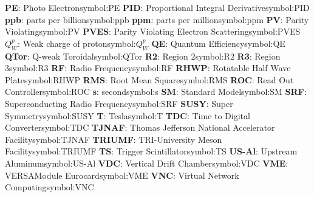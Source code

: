 \begin{tabbing}
\hspace{-0.27cm}
\addsymbol \textbf{PE}: {Photo Electron}{symbol:PE}
\hspace{-0.27cm}
\addsymbol \textbf{PID}: {Proportional Integral Derivative}{symbol:PID}
\hspace{-0.27cm}
\addsymbol \textbf{ppb}: {parts per billion}{symbol:ppb}
\hspace{-0.27cm}
\addsymbol \textbf{ppm}: {parts per million}{symbol:ppm}
\hspace{-0.27cm}
\addsymbol \textbf{PV}: {Parity Violating}{symbol:PV}
\hspace{-0.27cm}
\addsymbol \textbf{PVES}: {Parity Violating Electron Scattering}{symbol:PVES}
\hspace{-0.27cm}
\addsymbol \textbf{$Q_{W}^{p}$}: {Weak charge of proton}{symbol:$Q_{W}^{p}$}
\hspace{-0.27cm}
\addsymbol \textbf{QE}: {Quantum Efficiency}{symbol:QE}
\hspace{-0.27cm}
\addsymbol \textbf{QTor}: {Q-weak Toroidal}{symbol:QTor}
\hspace{-0.27cm}
\addsymbol \textbf{R2}: {Region 2}{symbol:R2}
\hspace{-0.27cm}
\addsymbol \textbf{R3}: {Region 3}{symbol:R3}
\hspace{-0.27cm}
\addsymbol \textbf{RF}: {Radio Frequency}{symbol:RF}
\hspace{-0.27cm}
\addsymbol \textbf{RHWP}: {Rotatable Half Wave Plate}{symbol:RHWP}
\hspace{-0.27cm}
\addsymbol \textbf{RMS}: {Root Mean Square}{symbol:RMS}
\hspace{-0.27cm}
\addsymbol \textbf{ROC}: {Read Out Controller}{symbol:ROC}
\hspace{-0.27cm}
\addsymbol \textbf{s}: {second}{symbol:s}
\hspace{-0.27cm}
\addsymbol \textbf{SM}: {Standard Model}{symbol:SM}
\hspace{-0.27cm}
\addsymbol \textbf{SRF}: {Superconducting Radio Frequency}{symbol:SRF}
\hspace{-0.27cm}
\addsymbol \textbf{SUSY}: {Super Symmetry}{symbol:SUSY}
\hspace{-0.27cm}
\addsymbol \textbf{T}: {Tesla}{symbol:T}
\hspace{-0.27cm}
\addsymbol \textbf{TDC}: {Time to Digital Converter}{symbol:TDC}
\hspace{-0.27cm}
\addsymbol \textbf{TJNAF}: {Thomas Jefferson National Accelerator Facility}{symbol:TJNAF}
\hspace{-0.27cm}
\addsymbol \textbf{TRIUMF}: {TRI-University Meson Facility}{symbol:TRIUMF}
\hspace{-0.27cm}
\addsymbol \textbf{TS}: {Trigger Scintillator}{symbol:TS}
\hspace{-0.27cm}
\addsymbol \textbf{US-Al}: {Upstream Aluminum}{symbol:US-Al}
\hspace{-0.27cm}
\addsymbol \textbf{VDC}: {Vertical Drift Chamber}{symbol:VDC}
\hspace{-0.27cm}
\addsymbol \textbf{VME}: {VERSAModule Eurocard}{symbol:VME}
\hspace{-0.27cm}
\addsymbol \textbf{VNC}: {Virtual Network Computing}{symbol:VNC}

\end{tabbing}
